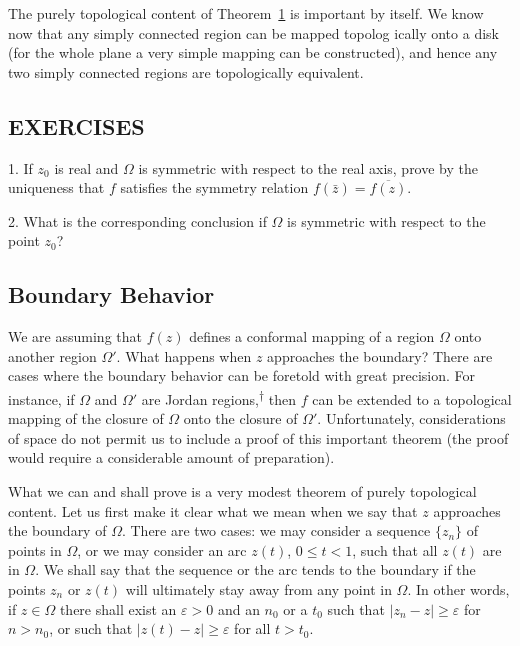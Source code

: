 The purely topological content of Theorem~\hyperref[thm:6.1]{1} is important by itself. We know now that any simply connected region can be mapped topolog%
%
ically onto a disk (for the whole plane a very simple mapping can be constructed), and hence any two simply connected regions are topologically equivalent.

\subsection*{EXERCISES}
1. If $z_{0}$ is real and $\Omega$ is symmetric with respect to the real axis, prove by the uniqueness that $f$ satisfies the symmetry relation $f(\bar{z}) = \overline{f(z)}$.

2. What is the corresponding conclusion if $\Omega$ is symmetric with respect to the point $z_0$?

\setcounter{section}{1}\setcounter{subsection}{1}\subsection{Boundary Behavior}\label{sec:6.1.2}
We are assuming that $f(z)$ defines a conformal mapping of a region $\Omega$ onto another region $\Omega'$. What happens when $z$ approaches the boundary? There are cases where the boundary behavior can be foretold with great precision. For instance, if $\Omega$ and $\Omega'$ are Jordan regions,\hyperlink{fn:248:dagger}{\textsuperscript{\ensuremath{\dagger}}} then $f$ can be extended to a topological mapping of the closure of $\Omega$ onto the closure of $\Omega'$. Unfortunately, considerations of space do not permit us to include a proof of this important theorem (the proof would require a considerable amount of preparation).

What we can and shall prove is a very modest theorem of purely topological content. Let us first make it clear what we mean when we say that $z$ approaches the boundary of $\Omega$. There are two cases: we may consider a sequence $\{z_n\}$ of points in $\Omega$, or we may consider an arc $z(t)$, $0 \leq t < 1$, such that all $z(t)$ are in $\Omega$. We shall say that the sequence or the arc tends to the boundary if the points $z_n$ or $z(t)$ will ultimately stay away from any point in $\Omega$. In other words, if $z \in \Omega$ there shall exist an $\varepsilon > 0$ and an $n_0$ or a $t_0$ such that $|z_n - z| \geq \varepsilon$ for $n > n_0$, or such that $|z(t) - z| \geq \varepsilon$ for all $t > t_0$.

